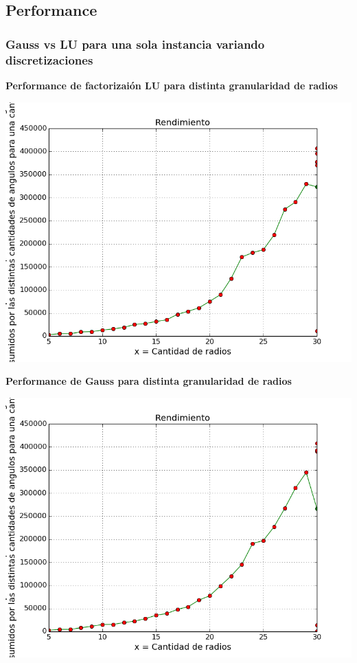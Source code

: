 \subsection{Performance}
\subsubsection{Gauss vs LU para una sola instancia variando discretizaciones}

  	\textbf{Performance de factorizai\'on LU para distinta granularidad de radios}\\

\begin{center}
\includegraphics[scale=0.65]{experimentos2a_2b/gaussMed.png}
\end{center}

  	\textbf{Performance de Gauss para distinta granularidad de radios}\\

\begin{center}
\includegraphics[scale=0.65]{experimentos2a_2b/Lumed.png}
\end{center}

